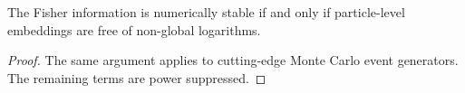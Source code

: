 \begin{proposition}[Renormalization]\label{thm:3}
The Fisher information is numerically stable if and only if
particle-level embeddings are free of non-global logarithms.
\end{proposition}

\begin{proof}
The same argument applies to cutting-edge Monte Carlo event generators.
The remaining terms are power suppressed.
\end{proof}

